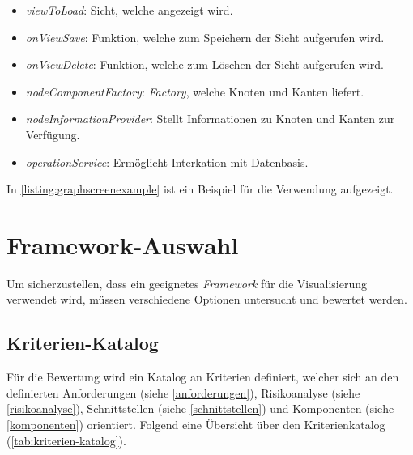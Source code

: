 \begin{itemize}
    \item \textit{viewToLoad}: Sicht, welche angezeigt wird.
    \item \textit{onViewSave}: Funktion, welche zum Speichern der Sicht aufgerufen wird.
    \item \textit{onViewDelete}: Funktion, welche zum Löschen der Sicht aufgerufen wird.
    \item \textit{nodeComponentFactory}: \textit{Factory}, welche Knoten und Kanten liefert.
    \item \textit{nodeInformationProvider}: Stellt Informationen zu Knoten und Kanten zur Verfügung.
    \item \textit{operationService}: Ermöglicht Interkation mit Datenbasis.
\end{itemize}


In \autoref{listing:graphscreenexample} ist ein Beispiel für die Verwendung aufgezeigt. 


\section{Framework-Auswahl}
Um sicherzustellen, dass ein geeignetes \textit{Framework} für die Visualisierung verwendet wird, müssen verschiedene Optionen untersucht und bewertet werden.
\subsection{Kriterien-Katalog}
Für die Bewertung wird ein Katalog an Kriterien definiert, welcher sich an den definierten Anforderungen (siehe \autoref{anforderungen}), Risikoanalyse (siehe \autoref{risikoanalyse}), Schnittstellen (siehe \autoref{schnittstellen}) und Komponenten (siehe \autoref{komponenten}) orientiert. Folgend eine Übersicht über den Kriterienkatalog (\autoref{tab:kriterien-katalog}). 

